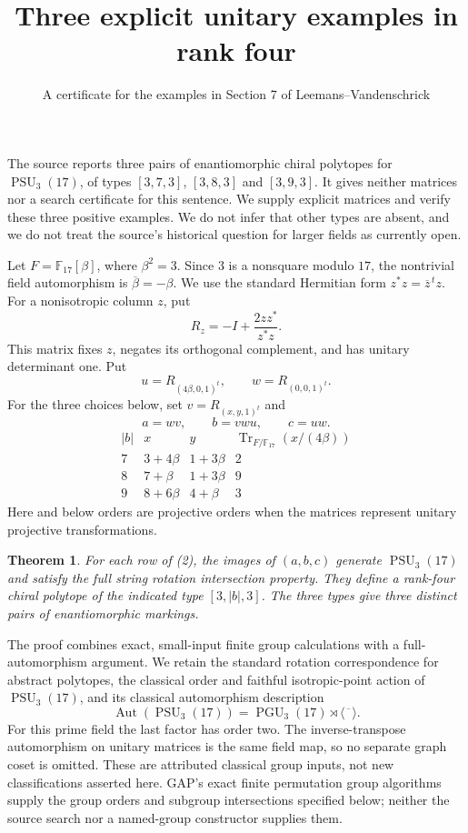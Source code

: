 \documentclass[11pt]{article}
\title{Three explicit unitary examples in rank four}
\author{A certificate for the examples in Section 7 of Leemans--Vandenschrick}\date{}
\newtheorem{theorem}{Theorem}\newtheorem{lemma}[theorem]{Lemma}
\newcommand{\F}{\mathbb F}\newcommand{\gen}[1]{\langle#1\rangle}
\begin{document}
\maketitle
The source reports three pairs of enantiomorphic chiral polytopes for
$\operatorname{PSU}_3(17)$, of types $[3,7,3]$, $[3,8,3]$ and $[3,9,3]$.
It gives neither matrices nor a search certificate for this sentence.
We supply explicit matrices and verify these three positive examples.
We do not infer that other types are absent, and we do not treat the
source's historical question for larger fields as currently open.

Let $F=\F_{17}[\beta]$, where $\beta^2=3$. Since $3$ is a nonsquare
modulo $17$, the nontrivial field automorphism is
$\overline\beta=-\beta$. We use the standard Hermitian form
$z^*z=\overline z^{\,t}z$. For a nonisotropic column $z$, put
\[
 R_z=-I+\frac{2zz^*}{z^*z}.
\]
This matrix fixes $z$, negates its orthogonal complement, and has
unitary determinant one. Put
\[
 u=R_{(4\beta,0,1)^t},\qquad w=R_{(0,0,1)^t}.
\]
For the three choices below, set $v=R_{(x,y,1)^t}$ and
\[
                 a=wv,\qquad b=vwu,\qquad c=uw.       \tag{1}
\]
\[
\begin{array}{c|c|c|c}
 |b|&x&y&\operatorname{Tr}_{F/\F_{17}}(x/(4\beta))\\\hline
 7&3+4\beta&1+3\beta&2\\
 8&7+\beta&1+3\beta&9\\
 9&8+6\beta&4+\beta&3
\end{array}                                                   \tag{2}
\]
Here and below orders are projective orders when the matrices represent
unitary projective transformations.

\begin{theorem}
For each row of (2), the images of $(a,b,c)$ generate
$\operatorname{PSU}_3(17)$ and satisfy the full string rotation
intersection property. They define a rank-four chiral polytope of the
indicated type $[3,|b|,3]$. The three types give three distinct
pairs of enantiomorphic markings.
\end{theorem}
The proof combines exact, small-input finite group calculations with a
full-automorphism argument. We retain the standard rotation
correspondence for abstract polytopes, the classical order and faithful
isotropic-point action of $\operatorname{PSU}_3(17)$, and its classical
automorphism description
\[
 \operatorname{Aut}(\operatorname{PSU}_3(17))
       =\operatorname{PGU}_3(17)\rtimes\gen{\overline{\phantom{x}}}.
                                                               \tag{3}
\]
For this prime field the last factor has order two. The inverse-transpose
automorphism on unitary matrices is the same field map, so no separate
graph coset is omitted. These are attributed classical group inputs,
not new classifications asserted here. GAP's exact finite permutation
group algorithms supply the group orders and subgroup intersections
specified below; neither the source search nor a named-group constructor
supplies them.
\end{document}
